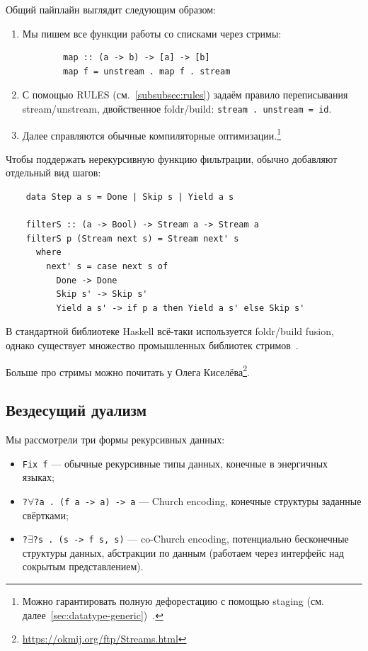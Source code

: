 Общий пайплайн выглядит следующим образом:
\begin{enumerate}
    \item Мы пишем все функции работы со списками через стримы:
    \begin{verbatim}
        map :: (a -> b) -> [a] -> [b]
        map f = unstream . map f . stream
    \end{verbatim}
    \item С помощью RULES (см.~\ref{subsubsec:rules}) задаём правило переписывания stream/unstream, двойственное foldr/build: \texttt{stream . unstream = id}.
    \item Далее справляются обычные компиляторные оптимизации.\footnote{Можно гарантировать полную дефорестацию с помощью staging (см. далее~\ref{sec:datatype-generic})~\cite{kiselyov2017stream}.}
\end{enumerate}

Чтобы поддержать нерекурсивную функцию фильтрации, обычно добавляют отдельный вид шагов:
\begin{verbatim}
    data Step a s = Done | Skip s | Yield a s

    filterS :: (a -> Bool) -> Stream a -> Stream a
    filterS p (Stream next s) = Stream next' s
      where
        next' s = case next s of
          Done -> Done
          Skip s' -> Skip s'
          Yield a s' -> if p a then Yield a s' else Skip s'
\end{verbatim}

В стандартной библиотеке Haskell всё-таки используется foldr/build fusion, однако существует множество промышленных библиотек стримов~\cite[глава 14]{bragilevsky-haskell}.

Больше про стримы можно почитать у Олега Киселёва\footnote{\url{https://okmij.org/ftp/Streams.html}}.

\subsection{Вездесущий дуализм} \label{subsec:data-duality}

Мы рассмотрели три формы рекурсивных данных:
\begin{itemize}
    \item \texttt{Fix f} --- обычные рекурсивные типы данных, конечные в энергичных языках;
    \item \texttt{?$\forall$?a . (f a -> a) -> a} --- Church encoding, конечные структуры заданные свёртками;
    \item \texttt{?$\exists$?s . (s -> f s, s)} --- co-Church encoding, потенциально бесконечные структуры данных, абстракции по данным (работаем через интерфейс над сокрытым представлением).
\end{itemize}

